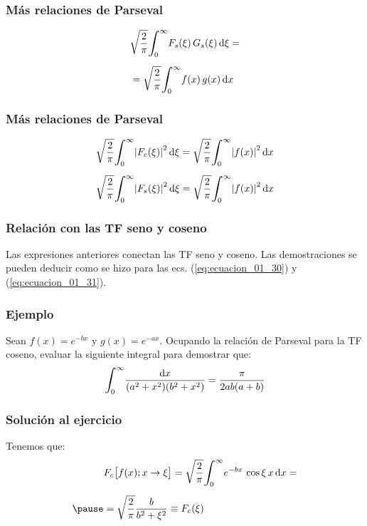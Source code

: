 \begin{frame}
\frametitle{Más relaciones de Parseval}
\begin{eqnarray}
\begin{aligned}[b]
&\sqrt{\dfrac{2}{\pi}} \scaleint{6ex}_{\bs 0}^{\infty} F_{s} (\xi) \, G_{s} (\xi) \dd{\xi} = \\[0.5em]
&= \sqrt{\dfrac{2}{\pi}} \scaleint{6ex}_{\bs 0}^{\infty} f (x) \, g (x) \dd{x}
\end{aligned}
\label{eq:ecuacion_01_33}
\end{eqnarray}
\end{frame}
\begin{frame}
\frametitle{Más relaciones de Parseval}
\begin{align}
&\sqrt{\dfrac{2}{\pi}} \scaleint{6ex}_{\bs 0}^{\infty} \abs{F_{c} (\xi)}^{2} \dd{\xi} = \sqrt{\dfrac{2}{\pi}} \scaleint{6ex}_{\bs 0}^{\infty} \abs{f (x)}^{2} \dd{x} \label{eq:ecuacion_01_34} \\[0.5em]
&\sqrt{\dfrac{2}{\pi}} \scaleint{6ex}_{\bs 0}^{\infty} \abs{F_{s} (\xi)}^{2} \dd{\xi} = \sqrt{\dfrac{2}{\pi}} \scaleint{6ex}_{\bs 0}^{\infty} \abs{f (x)}^{2} \dd{x} \label{eq:ecuacion_01_35}
\end{align}
\end{frame}
\begin{frame}
\frametitle{Relación con las TF seno y coseno}
Las expresiones anteriores conectan las TF seno y coseno. Las demostraciones se pueden deducir como se hizo para las ecs. (\ref{eq:ecuacion_01_30}) y (\ref{eq:ecuacion_01_31}).
\end{frame}
\begin{frame}
\frametitle{Ejemplo}
Sean $f (x) = e^{-bx}$ y $g (x) = e^{-ax}$. \pause Ocupando la relación de Parseval para la TF coseno, evaluar la siguiente integral para demostrar que:
\pause
\begin{align*}
\scaleint{6ex}_{\bs 0}^{\infty} \dfrac{\dd{x}}{(a^{2} + x^{2})(b^{2} + x^{2})} = \dfrac{\pi}{2 a b (a + b)}
\end{align*}
\end{frame}
\begin{frame}
\frametitle{Solución al ejercicio}
Tenemos que:
\pause
\begin{eqnarray*}
\begin{aligned}
&F_{c} \big[ f (x); x \to \xi \big] = \sqrt{\dfrac{2}{\pi}} \scaleint{6ex}_{\bs 0}^{\infty} e^{-b x} \, \cos \xi \, x \dd{x} = \\[0.5em] \pause
&= \sqrt{\dfrac{2}{\pi}} \dfrac{b}{b^{2} + \xi^{2}} \equiv F_{c} (\xi)
\end{aligned}
\end{eqnarray*}
\end{frame}
